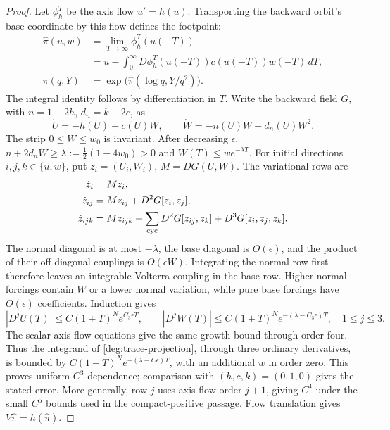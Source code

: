 \begin{proof}
Let \(\phi_h^T\) be the axis flow \(u'=h(u)\). Transporting the
backward orbit's base coordinate by this flow defines the footpoint:
\begin{equation}\label{deg:trace-projection}
\begin{split}
 \widehat\pi(u,w)
 &=\lim_{T\to\infty}\phi_h^T(u(-T))\\
 &=u-\int_0^\infty
 D\phi_h^T(u(-T))c(u(-T))w(-T)\,dT,\\
 \pi(q,Y)&=\exp\!\bigl(\widehat\pi(\log q,Y/q^2)\bigr).
\end{split}
\end{equation}
The integral identity follows by differentiation in \(T\).
Write the backward field \(G\), with \(n=1-2h\), \(d_n=k-2c\), as
\[
 \dot U=-h(U)-c(U)W,\qquad
 \dot W=-n(U)W-d_n(U)W^2.
\]
The strip \(0\le W\le w_0\) is invariant. After decreasing \(\epsilon\),
\(n+2d_nW\ge\lambda:=\tfrac12(1-4w_0)>0\) and
\(W(T)\le w e^{-\lambda T}\).
For initial directions \(i,j,k\in\{u,w\}\), put
\(z_i=(U_i,W_i)\), \(M=DG(U,W)\). The variational rows are
\begin{equation}\label{proj:backward-ordinary-jets}
 \begin{aligned}
 \dot z_i&=Mz_i,\\
 \dot z_{ij}&=Mz_{ij}+D^2G[z_i,z_j],\\
 \dot z_{ijk}&=Mz_{ijk}
 +\sum_{\rm cyc}D^2G[z_{ij},z_k]+D^3G[z_i,z_j,z_k].
 \end{aligned}
\end{equation}
The normal diagonal is at most \(-\lambda\), the base diagonal
is \(O(\epsilon)\), and the product of their off-diagonal couplings
is \(O(\epsilon W)\). Integrating the normal row first therefore
leaves an integrable Volterra coupling in the base row. Higher normal
forcings contain \(W\) or a lower normal variation, while pure base
forcings have \(O(\epsilon)\) coefficients. Induction gives
\[
 |D^jU(T)|\le C(1+T)^N e^{C_3\epsilon T},\qquad
 |D^jW(T)|\le C(1+T)^N e^{-(\lambda-C_3\epsilon)T},
 \quad 1\le j\le3.
\]
The scalar axis-flow equations give the same growth bound through order
four. Thus the integrand of \eqref{deg:trace-projection}, through three
ordinary derivatives, is bounded by
\(C(1+T)^Ne^{-(\lambda-C\epsilon)T}\), with an additional \(w\)
in order zero. This proves uniform \(C^3\) dependence; comparison with
\((h,c,k)=(0,1,0)\) gives the stated error. More generally, row \(j\)
uses axis-flow order \(j+1\), giving \(C^4\) under the small \(C^5\)
bounds used in the compact-positive passage. Flow translation gives
\(V\widehat\pi=h(\widehat\pi)\).


\end{proof}

